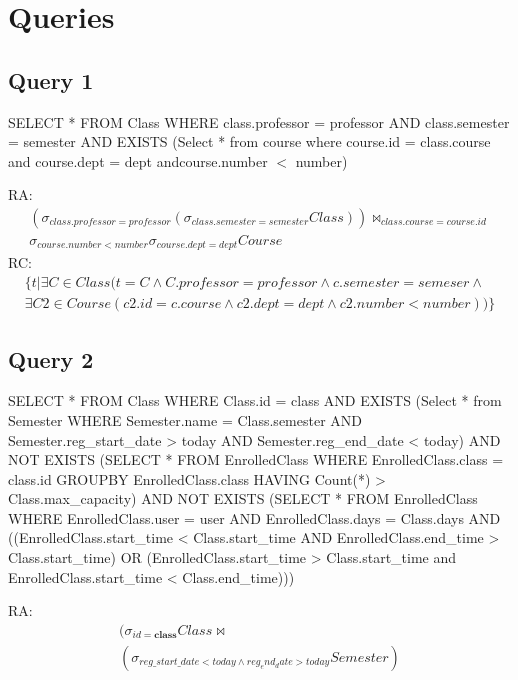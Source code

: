 \documentclass[11pt,oneside,a4paper]{article}
\begin{document}
\section{Queries}
\subsection{Query 1}
 SELECT * FROM Class WHERE class.professor = professor AND class.semester =
 semester AND EXISTS (Select * from course where course.id = class.course and
 course.dept = dept andcourse.number $<$ number) 

RA: 
\begin{align*}(\sigma_{class.professor = professor} (\sigma_{class.semester = semester}
Class)) \bowtie_{class.course = course.id} \\
\sigma_{course.number < number}
\sigma_{course.dept = dept} Course 
\end{align*}
RC: 
\begin{align*} \{t | \exists C \in Class ( t = C \wedge C.professor = professor \wedge
c.semester = semeser \wedge \\
\exists C2 \in Course ( c2.id = c.course \wedge
c2.dept = dept \wedge c2.number < number))\}\end{align*}

\subsection{Query 2}
SELECT * FROM Class WHERE Class.id = class AND EXISTS (Select * from Semester
WHERE Semester.name = Class.semester AND Semester.reg\_start\_date > today AND
Semester.reg\_end\_date < today) AND NOT EXISTS (SELECT * FROM EnrolledClass
WHERE EnrolledClass.class = class.id GROUPBY EnrolledClass.class HAVING
Count(*) > Class.max\_capacity) AND NOT EXISTS (SELECT * FROM EnrolledClass
WHERE EnrolledClass.user = user AND EnrolledClass.days = Class.days AND
((EnrolledClass.start\_time < Class.start\_time AND EnrolledClass.end\_time >
Class.start\_time) OR (EnrolledClass.start\_time > Class.start\_time and
EnrolledClass.start\_time < Class.end\_time)))

RA:
\begin{eqnarray*}

(\sigma_{id=\textbf{class}}Class \bowtie \\
(\sigma_{reg\_start\_date < today \wedge reg_end_date > today} Semester)

\end{eqnarray*}
\end{document}
